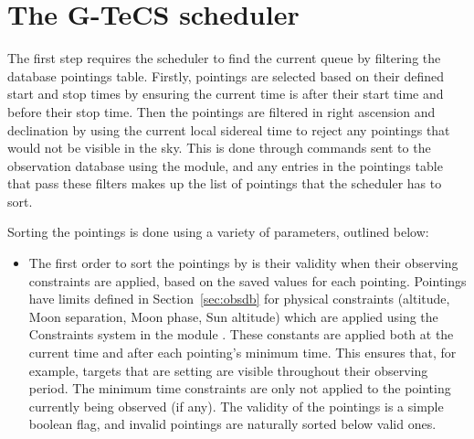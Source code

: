 \section{The G-TeCS scheduler}
\label{sec:scheduler_detail}
\begin{colsection}


\begin{colsection}


The first step requires the scheduler to find the current queue by filtering the database pointings table. Firstly, pointings are selected based on their defined start and stop times by ensuring the current time is after their start time and before their stop time. Then the pointings are filtered in right ascension and declination by using the current local sidereal time to reject any pointings that would not be visible in the sky. This is done through commands sent to the observation database using the  module, and any entries in the pointings table that pass these filters makes up the list of pointings that the scheduler has to sort.

Sorting the pointings is done using a variety of parameters, outlined below:

\begin{itemize}
\item The first order to sort the pointings by is their validity when their observing constraints are applied, based on the saved values for each pointing. Pointings have limits defined in Section~\ref{sec:obsdb} for physical constraints (altitude, Moon separation, Moon phase, Sun altitude) which are applied using the Constraints system in the   module \citep{astroplan}. These constants are applied both at the current time and after each pointing's minimum time. This ensures that, for example, targets that are setting are visible throughout their observing period. The minimum time constraints are only not applied to the pointing currently being observed (if any). The validity of the pointings is a simple boolean flag, and invalid pointings are naturally sorted below valid ones.


\end{itemize}
\end{colsection}
\end{colsection}
